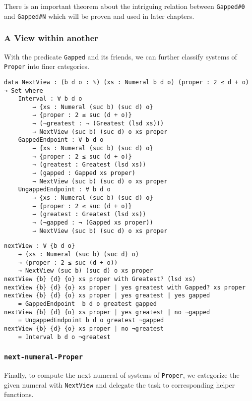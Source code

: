 \documentclass[\main/thesis.tex]{subfiles}
\begin{document}
There is an important theorem about the intriguing relation between
{\lstinline|Gapped#0|} and {\lstinline|Gapped#N|} which will be proven and used
in later chapters.

\subsubsection{A View within another}

With the predicate {\lstinline|Gapped|} and its friends, we can further classify
systems of {\lstinline|Proper|} into finer categories.

\begin{lstlisting}[basicstyle=\ttfamily\scriptsize]
data NextView : (b d o : ℕ) (xs : Numeral b d o) (proper : 2 ≤ d + o) → Set where
    Interval : ∀ b d o
        → {xs : Numeral (suc b) (suc d) o}
        → {proper : 2 ≤ suc (d + o)}
        → (¬greatest : ¬ (Greatest (lsd xs)))
        → NextView (suc b) (suc d) o xs proper
    GappedEndpoint : ∀ b d o
        → {xs : Numeral (suc b) (suc d) o}
        → {proper : 2 ≤ suc (d + o)}
        → (greatest : Greatest (lsd xs))
        → (gapped : Gapped xs proper)
        → NextView (suc b) (suc d) o xs proper
    UngappedEndpoint : ∀ b d o
        → {xs : Numeral (suc b) (suc d) o}
        → {proper : 2 ≤ suc (d + o)}
        → (greatest : Greatest (lsd xs))
        → (¬gapped : ¬ (Gapped xs proper))
        → NextView (suc b) (suc d) o xs proper
\end{lstlisting}

\begin{lstlisting}[basicstyle=\ttfamily\scriptsize]
nextView : ∀ {b d o}
    → (xs : Numeral (suc b) (suc d) o)
    → (proper : 2 ≤ suc (d + o))
    → NextView (suc b) (suc d) o xs proper
nextView {b} {d} {o} xs proper with Greatest? (lsd xs)
nextView {b} {d} {o} xs proper | yes greatest with Gapped? xs proper
nextView {b} {d} {o} xs proper | yes greatest | yes gapped
    = GappedEndpoint  b d o greatest gapped
nextView {b} {d} {o} xs proper | yes greatest | no ¬gapped
    = UngappedEndpoint b d o greatest ¬gapped
nextView {b} {d} {o} xs proper | no ¬greatest
    = Interval b d o ¬greatest
\end{lstlisting}

\subsubsection{{\lstinline|next-numeral-Proper|}}

Finally, to compute the next numeral of systems of {\lstinline|Proper|},
we categorize the given numeral with {\lstinline|NextView|}
and delegate the task to corresponding helper functions.
\end{document}
